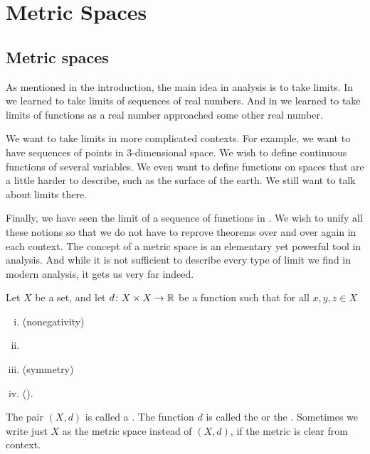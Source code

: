 \chapter{Metric Spaces} \label{ms:chapter}


\section{Metric spaces}
\label{sec:metric}


As mentioned in the introduction, the main idea in analysis is to take
limits.  In  we learned to take limits of sequences of
real numbers.  And in  we learned to take limits
of functions as a real number approached some other real number.

We want to take limits in more complicated contexts.  For
example, we want to have sequences of points in 3-dimensional space.
We wish to define continuous functions of several variables.
We even want to define functions on spaces that are a little harder to
describe, such as the surface of the earth.  We still want to talk about
limits there.

Finally, we have seen the limit of a sequence of
functions in .
We wish to unify all these notions so that we do not have to
reprove theorems over and over again in each context.  The concept of a
metric space is an elementary yet powerful tool in analysis.  And while it
is not sufficient to describe every type of limit we find in modern
analysis, it gets us very far indeed.

\begin{defn}
Let $X$ be a set, and let
$d \colon X \times X \to {\mathbb{R}}$
be a function such that for all $x,y,z \in X$
\begin{enumerate}[(i)]
%
\item \label{metric:pos}
(nonegativity)
%
\item \label{metric:zero}
%
\item \label{metric:com}
(symmetry)
%
\item \label{metric:triang}
(\emph{}).
\end{enumerate}
The pair $(X,d)$ is called a \emph{}.  The
function $d$ is called the \emph{} or the
\emph{}.
Sometimes we write just $X$ as the metric space instead of $(X,d)$, if the metric is clear from
context.
\end{defn}

